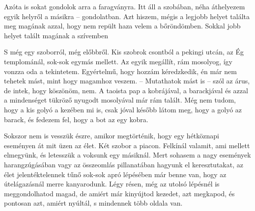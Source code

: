 Azóta is sokat gondolok arra a faragványra. Itt áll a szobában, néha
áthelyezem egyik helyről a másikra -- gondolatban. Azt hiszem, mégis
a legjobb helyet találta meg magának azzal, hogy nem repült haza
velem a bőröndömben. Sokkal jobb helyet talált magának a szívemben

\bigskip
S még egy szoborról, még előbbről. Kis szobrok csontból a pekingi
utcán, az Ég templománál, sok-sok egymás mellett. Az egyik megállít,
rám mosolyog, így vonzza oda a tekintetem. Egyértelmű, hogy hozzám
kéredzkedik, én már nem tehetek mást, mint hogy magamhoz veszem.
-- Mutathatok mást is -- szól az árus, de intek, hogy köszönöm,
nem. A taoista pap a kobrájával, a barackjával és azzal a mindenséget
tükröző nyugodt mosolyával már rám talált. Még nem tudom, hogy a
kis golyó a kezében mi is, csak jóval később látom meg, hogy a golyó az
barack, és fedezem fel, hogy a bot az egy kobra.

\bigskip
\begin{itshape}
Sokszor nem is vesszük észre, amikor megtörténik, hogy egy hétköznapi
eseményen át mit üzen az élet. Két szobor a piacon. Felkínál valamit, ami
mellett elmegyünk, és letesszük a voksunk egy másiknál. Mert sohasem
a nagy események harangzúgásában vagy az összeomlás pillanatában hagyunk
el keresztutakat, az élet jelentéktelennek tűnő sok-sok apró lépésében
már benne van, hogy az útelágazásnál merre kanyarodunk. Légy résen,
még az utolsó lépésnél is meggondolhatod magad, de amiért már kinyújtod
kezedet, azt megkapod, és pontosan azt, amiért nyúltál, s mindennek több
oldala van.
\end{itshape}
